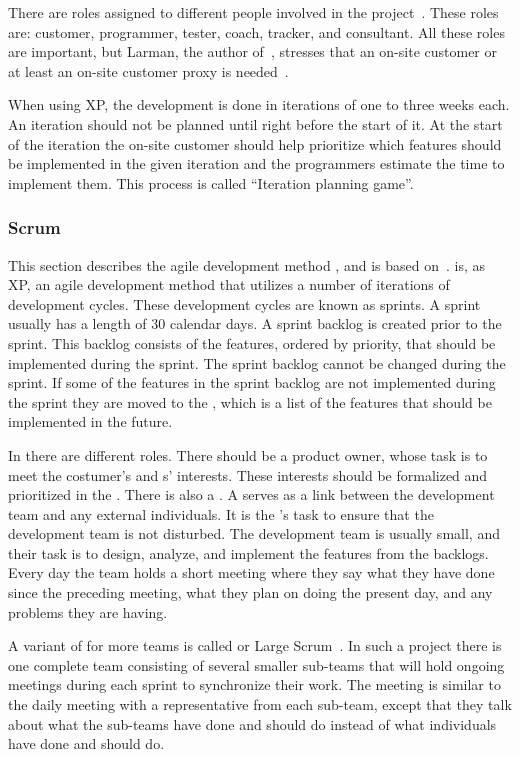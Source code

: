 There are roles assigned to different people involved in the project~\cite[p.~145]{Larman04}.
These roles are: customer, programmer, tester, coach, tracker, and consultant.
All these roles are important, but Larman, the author of~\cite{Larman04}, stresses that an on-site customer or at least an on-site customer proxy is needed~\cite[p.~152-156]{Larman04}.

When using XP, the development is done in iterations of one to three weeks each.
An iteration should not be planned until right before the start of it.
At the start of the iteration the on-site customer should help prioritize which features should be implemented in the given iteration and the programmers estimate the time to implement them.
This process is called ``Iteration planning game''.

\subsubsection{Scrum}
\label{par:scrum}
This section describes the agile development method \scrum{}, and is based on~\cite[chap.~7,pp.~109-136]{Larman04}.
\Scrum{} is, as XP, an agile development method that utilizes a number of iterations of development cycles.
These development cycles are known as sprints.
A sprint usually has a length of 30 calendar days.
A sprint backlog is created prior to the sprint. 
This backlog consists of the features, ordered by priority, that should be implemented during the sprint.
The sprint backlog cannot be changed during the sprint.
If some of the features in the sprint backlog are not implemented during the sprint they are moved to the \productbacklog{}, which is a list of the features that should be implemented in the future.

In \scrum{} there are different roles.
There should be a product owner, whose task is to meet the costumer's and \euser{}s' interests. 
These interests should be formalized and prioritized in the \productbacklog{}.
There is also a \scrummaster{}. 
A \scrummaster{} serves as a link between the development team and any external individuals.
It is the \scrummaster{}'s task to ensure that the development team is not disturbed.
The development team is usually small, and their task is to design, analyze, and implement the features from the backlogs.
Every day the \scrum{} team holds a short meeting where they say what they have done since the preceding meeting, what they plan on doing the present day, and any problems they are having.

A variant of \scrum{} for more teams is called \sos{} or Large Scrum~\cite[pp.~23-30]{scrumchecklist}\cite[p.~111]{Larman04}.
In such a project there is one complete team consisting of several smaller sub-teams that will hold ongoing \sos{} meetings during each sprint to synchronize their work.
The \sos{} meeting is similar to the daily \scrum{} meeting with a representative from each sub-team, except that they talk about what the sub-teams have done and should do instead of what individuals have done and should do.

